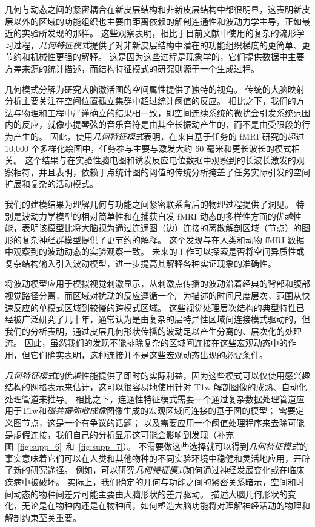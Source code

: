 \documentclass[lang=cn,a4paper,newtx,citestyle=gb7714-2015, bibstyle=gb7714-2015]{elegantpaper}
\begin{document}
几何与动态之间的紧密耦合在新皮层结构和非新皮层结构中都很明显，这表明新皮层以外的区域的功能组织也主要由距离依赖的解剖连通性和波动力学主导，正如最近的实验所发现的那样\cite{raut2021global,hamid2021wave,yousefi2021propagating}。
这些观察表明，相比于目前文献中使用的复杂的流形学习过程，\textit{几何特征模式}提供了对非新皮层结构中潜在的功能组织梯度的更简单、更节约和机械性更强的解释。
这是因为这些过程是现象学的，它们提供数据中主要方差来源的统计描述，而结构特征模式的研究则源于一个生成过程。


几何模式分解为研究大脑激活图的空间属性提供了独特的视角。
传统的大脑映射分析主要关注在空间位置孤立集群中超过统计阈值的反应。
相比之下，我们的方法与物理和工程中严谨确立的结果相一致，即空间连续系统的微扰会引发系统范围内的反应，就像小提琴弦的音乐音符是由其全长振动产生的，而不是由受限段的行为产生的。
因此，使用\textit{几何特征模式}表明，在来自基于任务的 fMRI 研究的超过 10,000 个多样化绘图中，任务参与主要与激发大约 60 毫米和更长波长的模式相关。
这个结果与在实验性脑电图和诱发反应电位数据中观察到的长波长激发的观察相符，并且表明，依赖于点统计图的阈值的传统分析掩盖了任务实际引发的空间扩展和复杂的活动模式。


我们的建模结果为理解几何与功能之间紧密联系背后的物理过程提供了洞见。
特别是波动力学模型的相对简单性和在捕获自发 fMRI 动态的多样性方面的优越性能，表明该模型比将大脑视为通过连通图（边）连接的离散解剖区域（节点）的图形的复杂神经群模型提供了更节约的解释。
这个发现与在人类和动物 fMRI 数据中观察到的波动动态的实验观察一致。
未来的工作可以探索是否将空间异质性或复杂结构输入引入波动模型，进一步提高其解释各种实证现象的准确性。


将波动模型应用于模拟视觉刺激显示，从刺激点传播的波动沿着经典的背部和腹部视觉路径分离，而区域对扰动的反应遵循一个广为描述的时间尺度层次，范围从快速反应的单模式区域到较慢的跨模式区域。
这些视觉处理层次结构的典型特性已经被广泛研究了几十年，通常认为是由复杂的层特异性区域间连接模式驱动的，但我们的分析表明，通过皮层几何形状传播的波动足以产生分离的、层次化的处理流。
因此，虽然我们的发现不能排除复杂的区域间连接在这些宏观动态中的作用，但它们确实表明，这种连接并不是这些宏观动态出现的必要条件。


\textit{几何特征模式}的优越性能提供了即时的实际利益，因为这些模式可以仅使用感兴趣结构的网格表示来估计，这可以很容易地使用针对 T1w 解剖图像的成熟、自动化处理管道来推导。
相比之下，连通性特征模式需要一个通过复杂数据处理管道应用于T1w和\textit{磁共振弥散成像}图像生成的宏观区域间连接的基于图的模型；
需要定义图节点，这是一个有争议的话题；
以及需要应用一个阈值处理程序来去除可能是虚假连接，我们自己的分析显示这可能会影响到发现（补充图~\ref{fig:supp_6}~和~\ref{fig:supp_7}）。
不需要做这些选择就可以得到\textit{几何特征模式}的事实意味着它们可以在人类和其他物种的不同实验环境中稳健和灵活地应用，开辟了新的研究途径。
例如，可以研究\textit{几何特征模式}如何通过神经发展变化或在临床疾病中被破坏。
实际上，我们确定的几何与功能之间的紧密关系暗示，空间和时间动态的物种间差异可能主要由大脑形状的差异驱动。
描述大脑几何形状的变化，无论是在物种内还是在物种间，如何塑造大脑功能将对理解神经活动的物理和解剖约束至关重要。
\end{document}
